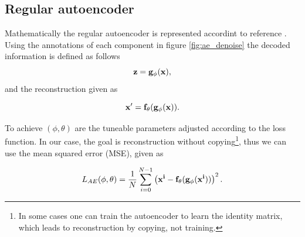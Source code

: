 \subsection*{Regular autoencoder}
Mathematically the regular autoencoder is represented accordint to reference \cite{weng2018VAE}. 
Using the annotations of each component in figure \ref{fig:ae_denoise} the decoded information is defined as follows 
\begin{equation*}
    \bf{z} = g_{\phi}(\bf{x}),
\end{equation*}    
and the reconstruction given as 

\begin{equation*}
    \bf{x'} = f_{\theta}(g_{\phi}(\bf{x})).
\end{equation*}  

To achieve $(\phi,\theta)$ are the tuneable parameters adjusted according to the loss function. In our case, the goal is
reconstruction without copying\footnote{In some cases one can train the autoencoder to learn the identity matrix, 
which leads to reconstruction by copying, not training.}, thus we can use the mean squared error (MSE), given as 

\begin{equation}\label{eq:loss_ae}
    L_{AE} (\phi,\theta) = \frac{1}{N}\sum_{i=0}^{N-1} \left(\bf{x}^{i} - f_{\theta}(g_{\phi}(\bf{x}^{i}))\right)^{2}.
\end{equation}

